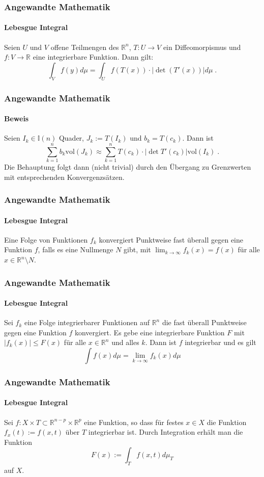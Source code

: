 \documentclass{beamer}
\begin{document}
\begin{frame}
    \frametitle{Angewandte Mathematik}
\framesubtitle{Lebesgue Integral}
\begin{block}{}
Seien $U$ und $V$ offene Teilmengen des $\mathbb{R}^n$, $T: U \to V$ ein Diffeomorpismus und $f: V \to \mathbb{R}$ eine integrierbare Funktion. Dann gilt:
$$ \int_V  f(y)  d \mu = \int_U f(T (x))  \cdot | \det(T' (x)) | d \mu   \; .$$
\end{block}
 \end{frame}

\begin{frame}
    \frametitle{Angewandte Mathematik}
\framesubtitle{Beweis}
Seien $I_k \in \mathbb{I}(n)$ Quader, $J_k := T(I_k)$ und $b_k = T(c_k)$. Dann ist 
$$\sum_{k=1}^n  b_k  \text{vol}(J_k) \approx  \sum_{k=1}^n T(c_k) \cdot | \det T' (c_k)|  \text{vol}(I_k) \; .$$
Die Behauptung folgt dann (nicht trivial) durch den Übergang zu Grenzwerten mit entsprechenden Konvergenzsätzen.
 \end{frame}



\begin{frame}
    \frametitle{Angewandte Mathematik}
\framesubtitle{Lebesgue Integral}
\begin{block}{}
Eine Folge von Funktionen $f_k$ konvergiert Punktweise fast überall gegen eine Funktion $f$, falls es eine Nullmenge $N$ gibt, mit 
$\lim_{k \to \infty} f_k (x) = f(x)$ für alle $x \in \mathbb{R}^n \setminus N$.
\end{block}
 \end{frame}


\begin{frame}
    \frametitle{Angewandte Mathematik}
\framesubtitle{Lebesgue Integral}
\begin{block}{}
Sei $f_k$ eine Folge integrierbarer Funktionen auf $\mathbb{R}^n$ die fast überall Punktweise gegen eine Funktion $f$ konvergiert.
Es gebe eine integrierbare Funktion $F$ mit $|f_k (x)| \leq F(x) $ für alle $x \in \mathbb{R}^n$ und alles $k$. Dann ist $f$ integrierbar und es gilt
$$ \int f(x) d \mu = \lim_{k \to \infty} f_k(x) d \mu $$
\end{block}
 \end{frame}



\begin{frame}
    \frametitle{Angewandte Mathematik}
\framesubtitle{Lebesgue Integral}
\begin{block}{}
Sei $f: X \times T \subset \mathbb{R}^{n-p} \times \mathbb{R}^p$ eine Funktion, so dass für festes $x \in X$ die Funktion $f_x(t) := f(x,t)$ über $T$ integrierbar ist. Durch Integration erhält man die Funktion 
$$ F(x) := \int_T f(x,t)  d \mu_T$$ 
auf $X$.
\end{block}
 \end{frame}
\end{document}
